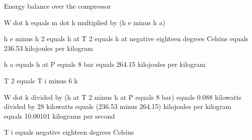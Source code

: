 Energy balance over the compressor

W dot k equals m dot k multiplied by (h e minus h a)

h e minus h 2 equals h at T 2 equals h at negative eighteen degrees Celsius equals 236.53 kilojoules per kilogram

h a equals h at P equals 8 bar equals 264.15 kilojoules per kilogram

T 2 equals T i minus 6 k

W dot k divided by (h at T 2 minus h at P equals 8 bar) equals 0.088 kilowatts divided by 28 kilowatts equals (236.53 minus 264.15) kilojoules per kilogram equals 10.00101 kilograms per second

T i equals negative eighteen degrees Celsius